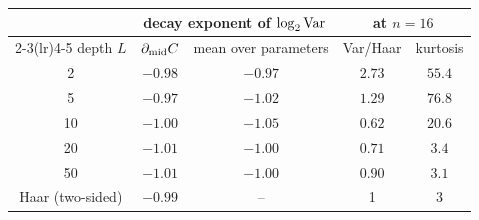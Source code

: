 \begin{tabular}{ccccc}
\toprule
& \multicolumn{2}{c}{decay exponent of $\log_2\mathrm{Var}$} & \multicolumn{2}{c}{at $n = 16$} \\
\cmidrule(lr){2-3}\cmidrule(lr){4-5}
depth $L$ & $\partial_{\rm mid}C$ & mean over parameters & Var/Haar & kurtosis \\
\midrule
2 & $-0.98$ & $-0.97$ & $2.73$ & $55.4$ \\
5 & $-0.97$ & $-1.02$ & $1.29$ & $76.8$ \\
10 & $-1.00$ & $-1.05$ & $0.62$ & $20.6$ \\
20 & $-1.01$ & $-1.00$ & $0.71$ & $3.4$ \\
50 & $-1.01$ & $-1.00$ & $0.90$ & $3.1$ \\
\midrule
Haar (two-sided) & $-0.99$ & -- & 1 & 3 \\
\bottomrule
\end{tabular}
